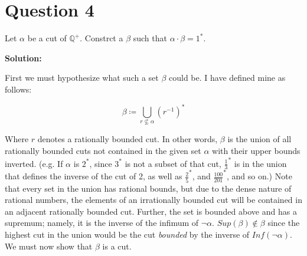 \documentclass[12pt, letterpaper]{article}
\begin{document}
\section*{Question 4}
Let $\alpha$ be a cut of $\mathbb{Q}^+$. Constrct a $\beta$ such that $\alpha \cdot \beta = 1^*$.

\noindent\textbf{Solution:}

\noindent First we must hypothesize what such a set $\beta$ could be. I have defined mine as follows:

$$\beta \coloneqq \bigcup\limits_{r \nsubseteq \alpha} (r^{-1})^*$$

Where $r$ denotes a rationally bounded cut. In other words, $\beta$ is the union of all rationally bounded cuts not contained in the given set $\alpha$ with their upper bounds inverted.
(e.g. If $\alpha$ is $2^*$, since $3^*$ is not a subset of that cut, $\frac{1}{3}^*$
is in the union that defines the inverse of the cut of 2, as well as $\frac{2}{5}^*$, and $\frac{100}{201}^*$, and so on.) Note that every set in the union has rational bounds,
but due to the dense nature of rational numbers, the elements of an irrationally bounded cut will be contained in an adjacent rationally bounded cut. Further,
the set is bounded above and has a supremum; namely, it is the inverse of the infimum of $\neg \alpha$. $Sup(\beta) \notin \beta$ since the highest cut in the union would be the cut \textit{bounded} by the inverse of $Inf(\neg \alpha)$.
We must now show that $\beta$ is a cut.
\end{document}
